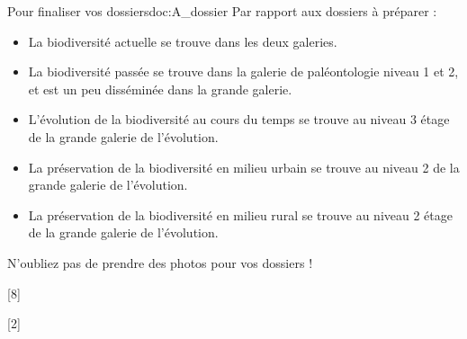 \teteSndAP
{}


\begin{center}
\end{center}

\begin{doc}{Pour finaliser vos dossiers}{doc:A_dossier}
  Par rapport aux dossiers à préparer :
  \begin{itemize}
    \item La biodiversité actuelle se trouve dans les deux galeries.
    \item La biodiversité passée se trouve dans la galerie de paléontologie niveau 1 et 2, et est un peu disséminée dans la grande galerie.
    \item L’évolution de la biodiversité au cours du temps se trouve au niveau 3 étage de la grande galerie de l'évolution.
    \item La préservation de la biodiversité en milieu urbain se trouve au niveau 2 de la grande galerie de l'évolution.
    \item La préservation de la biodiversité en milieu rural se trouve au niveau 2 étage de la grande galerie de l'évolution.
  \end{itemize}
N'oubliez pas de prendre des photos pour vos dossiers !
\end{doc}

[8]

[2]

